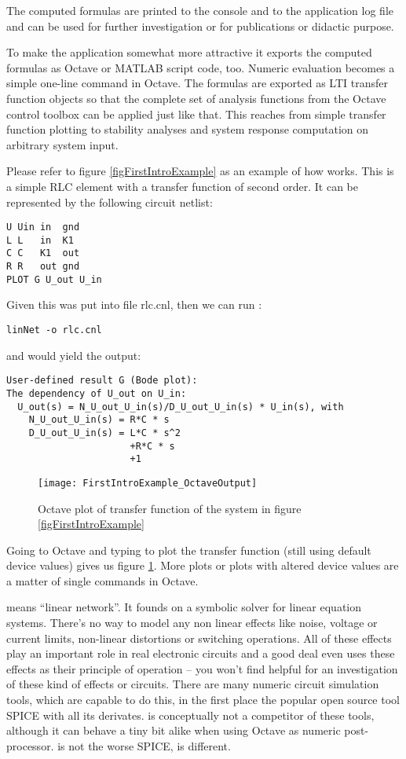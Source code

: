 The computed formulas are printed to the console and to the application
log file and can be used for further investigation or for publications or
didactic purpose.

To make the application somewhat more attractive it exports the computed
formulas as Octave or MATLAB script code, too. Numeric evaluation becomes
a simple one-line command in Octave. The formulas are exported as LTI
transfer function objects so that the complete set of analysis functions
from the Octave control toolbox can be applied just like that. This
reaches from simple transfer function plotting to stability analyses and
system response computation on arbitrary system input.

Please refer to figure \ref{figFirstIntroExample} as an example
of how \linnet{} works. This is a simple RLC element with a transfer
function of second order. It can be represented by the following circuit
netlist:
\begin{verbatim}
U Uin in  gnd
L L   in  K1
C C   K1  out
R R   out gnd
PLOT G U_out U_in
\end{verbatim}
Given this was put into file rlc.cnl, then we can run \linnet{}:
\begin{verbatim}
linNet -o rlc.cnl
\end{verbatim}
and would yield the output:
\begin{verbatim}
User-defined result G (Bode plot):
The dependency of U_out on U_in:
  U_out(s) = N_U_out_U_in(s)/D_U_out_U_in(s) * U_in(s), with
    N_U_out_U_in(s) = R*C * s
    D_U_out_U_in(s) = L*C * s^2
                      +R*C * s
                      +1
\end{verbatim}

\begin{figure}
\centering
\texttt{[image: FirstIntroExample\_OctaveOutput]}
\caption{Octave plot of transfer function of the system in figure
\ref{figFirstIntroExample}}
\label{figFirstIntroExample_OctaveOutput}
\end{figure}

Going to Octave and typing  to plot the transfer function (still
using default device values) gives us figure
\ref{figFirstIntroExample_OctaveOutput}. More plots or plots with altered
device values are a matter of single commands in Octave.

\linnet{} means ``linear network''. It founds on a symbolic solver for
linear equation systems. There's no way to model any non linear effects
like noise, voltage or current limits, non-linear distortions or switching
operations. All of these effects play an important role in real electronic
circuits and a good deal even uses these effects as their principle of
operation -- you won't find \linnet{} helpful for an investigation of
these kind of effects or circuits. There are many numeric circuit
simulation tools, which are capable to do this, in the first place the
popular open source tool SPICE with all its derivates. \linnet{} is
conceptually not a competitor of these tools, although it can behave a
tiny bit alike when using Octave as numeric post-processor. \linnet{} is
not the worse SPICE, \linnet{} is different.